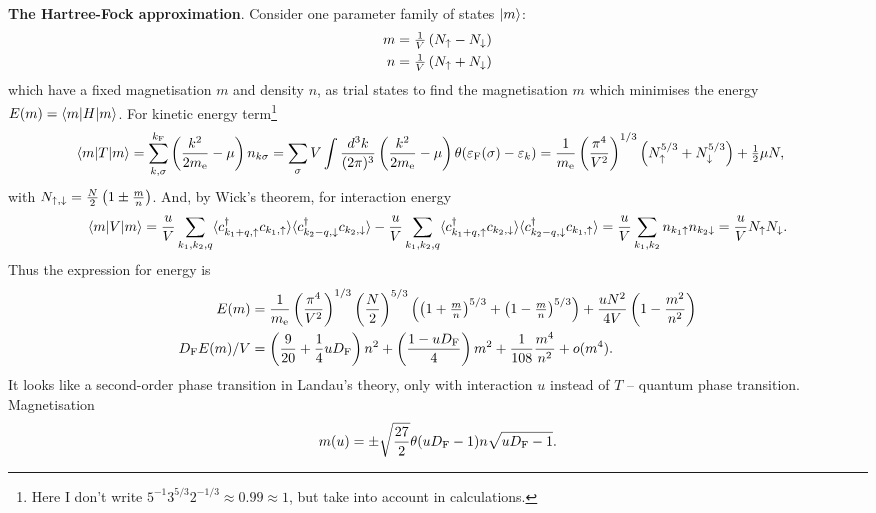 \textbf{The Hartree-Fock approximation}.  Consider one parameter family of states $\left| m \right\rangle$:
\begin{equation*}
	\left.\begin{aligned}
	    m &= \tfrac{1}{V}\left(N_\uparrow - N_\downarrow\right)\\
	    n &= \tfrac{1}{V}\left(N_\uparrow + N_\downarrow\right)
	\end{aligned}\right.
\end{equation*}
which have a fixed magnetisation $m$ and density $n$, as trial states to find the magnetisation $m$ which minimises the energy $E(m) = \bk{m}[H]{m}$.  For kinetic energy term\footnote{
	Here I don't write $5^{-1} 3^{5/3} 2^{-1/3} \approx 0.99 \approx 1$, but take into account in calculations.
}
\begin{align*}
	\bk{m}[T]{m} &= \sum_{k, \sigma}^{\kF} \left(\frac{k^2}{2\sub{m}{e}} - \mu\right) n_{k \sigma} = \sum_\sigma V \int \frac{d^3 k}{(2\pi)^3} \left(\frac{k^2}{2\sub{m}{e}} - \mu\right)  \theta(\eF(\sigma) - \varepsilon_k) 
	= \frac{1}{\sub{m}{e}}\left(\frac{\pi^4}{V^2}\right)^{1/3} \left(N_\up^{5/3} + N_\down^{5/3}\right) + \tfrac{1}{2} \mu N,
\end{align*}
with $N_{\uparrow,\downarrow} = \frac{N}{2} \left(1 \pm \frac{m}{n}\right)$. And, by Wick's theorem, for interaction energy
\begin{equation*}
	\bk{m}[V]{m} 
	= 
	\frac{u}{V} \sum_{k_1, k_2, q} \langle 
		c\D_{k_1 + q, \up} c_{k_1, \up}
	\rangle \langle c\D_{k_2 - q, \down} c_{k_2, \down} \rangle
	- \frac{u}{V} \sum_{k_1, k_2, q} \langle 
		c\D_{k_1 + q, \up} c_{k_2, \down} \rangle \langle  c\D_{k_2 - q, \down} c_{k_1, \up}
	\rangle = \frac{u}{V} \sum_{k_1, k_2} n_{k_1 \up} n_{k_2 \down} = \frac{u}{V} N_\up N_\down.
\end{equation*}
Thus the expression for energy is
\begin{align*}
	E(m) 
	&= 
	\frac{1}{m_{\textnormal{e}}}\left(\frac{\pi^4}{V^2}\right)^{1/3} \left(\frac{N}{2}\right)^{5/3} \left(
		\left(1 + \tfrac{m}{n}\right)^{5/3}+\left(1 - \tfrac{m}{n}\right)^{5/3}
	\right) + \frac{u N^2}{4V}  \left(1 - \frac{m^2}{n^2}\right) 
	\\
	D_{\textnormal{F}} E(m) / V &=
	\left(\frac{9}{20} + \frac{1}{4}u D_{\textnormal{F}}\right)n^2 +   \left(\frac{1 - u D_{\textnormal{F}} }{4}\right) m^2 + \frac{1}{108}  \frac{m^4}{n^2} + o(m^4).
\end{align*}
It looks like a second-order phase transition in Landau's theory, only with interaction $u$ instead of $T$ -- quantum phase transition. Magnetisation
\begin{equation*}
	m(u) = \pm \sqrt{\frac{27}{2}}\theta(u D_{\textnormal{F}} - 1)  n \sqrt{u D_{\textnormal{F}} - 1}.
\end{equation*}

